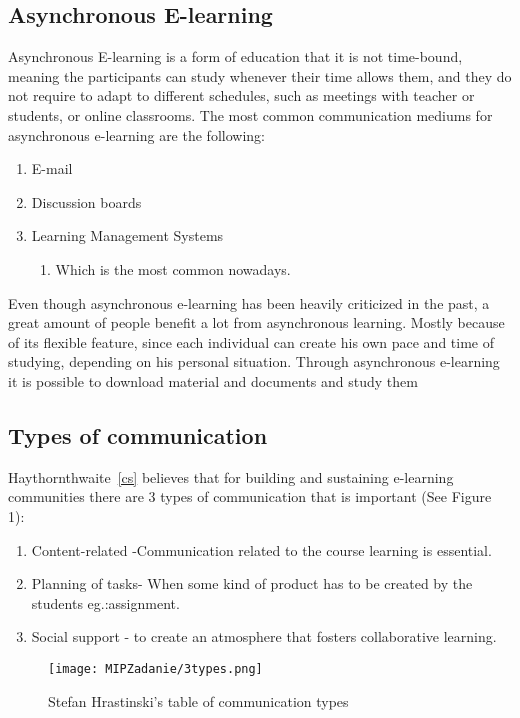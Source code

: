 \documentclass[10pt,twoside,english,a4paper]{article}
\begin{document}
\subsection{Asynchronous E-learning} \label{ina:nejake}
Asynchronous E-learning is a form of education that it is not time-bound, meaning the participants can study whenever their time allows them, and they do not require to adapt to different schedules, such as meetings with teacher or students, or online classrooms. The most common communication mediums for asynchronous e-learning are the following:
\begin{enumerate}
\item E-mail
\item Discussion boards
\item Learning Management Systems
	\begin{enumerate}
	\item Which is the most common nowadays.
	\end{enumerate}
\end{enumerate}
Even though asynchronous e-learning has been heavily criticized in the past, a great amount of people benefit a lot from asynchronous learning. Mostly because of its flexible feature, since each individual can create his own pace and time of studying, depending on his personal situation. Through asynchronous e-learning it is possible to download material and documents and study them

\subsection{Types of communication} \label{ina:este}

Haythornthwaite~\ref{cs} believes that for building and sustaining e-learning communities there are 3 types of communication that is important (See Figure 1):
\begin{enumerate}
\item Content-related -Communication related to the course learning is essential.
\item Planning of tasks- When some kind of product has to be created by the students eg.:assignment.
\item Social support - to create an atmosphere that fosters collaborative learning.
\end{enumerate}


\begin{figure*}[tb]
\centering
\texttt{[image: MIPZadanie/3types.png]}

\caption{Stefan Hrastinski's table of communication types}
\label{f:rozhod}
\end{figure*}
\end{document}
